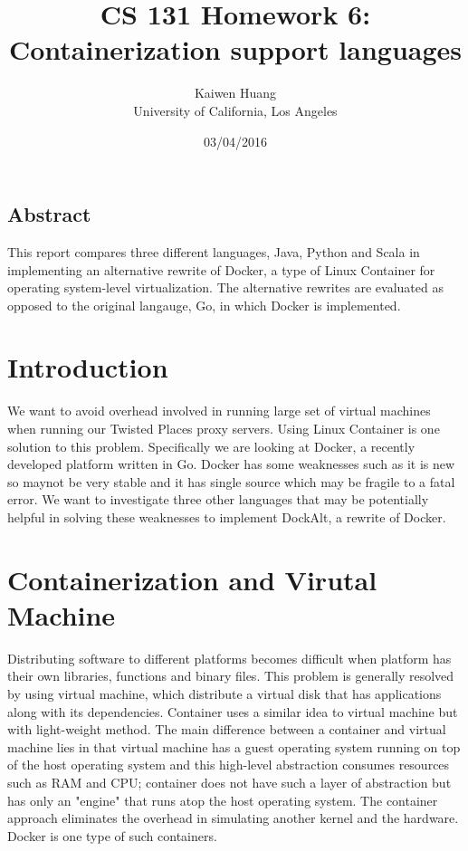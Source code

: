 \documentclass[letterpaper,twocolumn,10pt]{article}
\begin{document}
\date{ 03/04/2016}

\title{\Large \bf CS 131 Homework 6: Containerization support languages}

\author{
{\rm Kaiwen Huang}\\
University of California, Los Angeles
} %

\maketitle

\thispagestyle{empty}


\subsection*{Abstract}
This report compares three different languages, Java, Python and Scala in implementing an alternative rewrite of Docker, a type of Linux Container for operating system-level virtualization. The alternative rewrites are evaluated as opposed to the original langauge, Go, in which Docker is implemented.
\section{Introduction}
We want to avoid overhead involved in running large set of virtual machines when running our Twisted Places proxy servers. Using Linux Container is one solution to this problem. Specifically we are looking at Docker, a recently developed platform written in Go. Docker has some weaknesses such as it is new so maynot be very stable and it has single source which may be fragile to a fatal error. We want to investigate three other languages that may be potentially helpful in solving these weaknesses to implement DockAlt, a rewrite of Docker. 

\section{Containerization and Virutal Machine}
Distributing software to different platforms becomes difficult when platform has their own libraries, functions and binary files. This problem is generally resolved by using virtual machine, which distribute a virtual disk that has applications along with its dependencies. Container uses a similar idea to virtual machine but with light-weight method. The main difference between a container and virtual machine lies in that virtual machine has a guest operating system running on top of the host operating system and this high-level abstraction consumes resources  such as RAM and CPU; container does not have such a layer of abstraction but has only an "engine" that runs atop the host operating system. The container approach eliminates the overhead in simulating another kernel and the hardware. Docker is one type of such containers.
\end{document}
